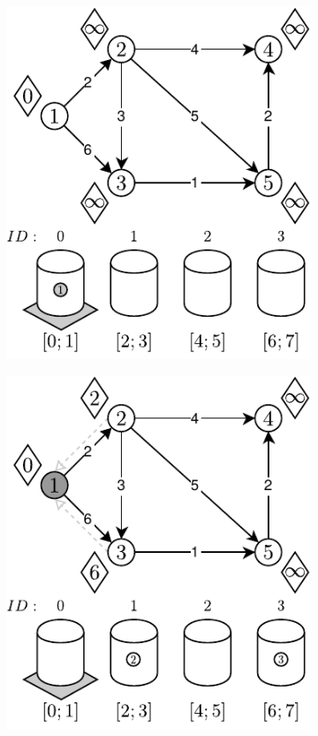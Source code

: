 \begin{figure}[!htbp]
	\centering
	\begin{subfigure}[b]{0.3\textwidth}
		\includegraphics[width=\textwidth]{Chapter_II/APROXIMATE-BUCKETS-Example/a.pdf}
		\caption{}
	\end{subfigure}%
	\begin{subfigure}[b]{0.3\textwidth}
		\includegraphics[width=\textwidth]{Chapter_II/APROXIMATE-BUCKETS-Example/b.pdf}

\end{subfigure}
\end{figure}

